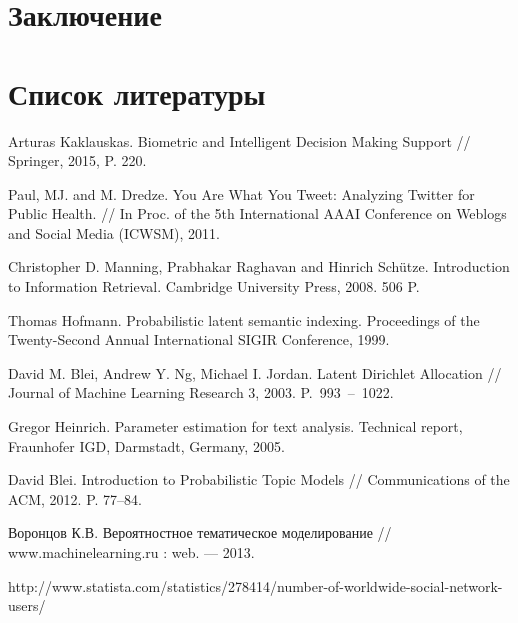 \documentclass[a4paper]{report}
\begin{document}
	
	
	
	\section{Заключение}
	
	
	
	\newpage
	\section{Список литературы}
	
    \begingroup
    \let\clearpage\relax
    \vskip-3cm
	\begin{thebibliography}{9}
	
		Arturas Kaklauskas. Biometric and Intelligent Decision Making Support // Springer, 2015, P. 220.
		
		Paul, MJ. and M. Dredze. You Are What You Tweet: Analyzing Twitter for Public Health. // In Proc. of the 5th International AAAI Conference on Weblogs and Social Media (ICWSM),  2011. 
		
		Christopher D. Manning, Prabhakar Raghavan and Hinrich Schütze. Introduction to Information Retrieval. Cambridge University Press, 2008. 506 P.
		
		Thomas Hofmann. Probabilistic latent semantic indexing. Proceedings of the Twenty-Second Annual International SIGIR Conference, 1999.
		
		David M. Blei, Andrew Y. Ng, Michael I. Jordan. Latent Dirichlet Allocation // Journal of Machine Learning Research 3, 2003. P.~993~--~1022.
		
		Gregor Heinrich. Parameter estimation for text analysis. Technical
report, Fraunhofer IGD, Darmstadt, Germany, 2005.

		David Blei. Introduction to Probabilistic Topic Models // Communications of the ACM, 2012. P. 77–84.

		Воронцов К.В. Вероятностное тематическое моделирование // www.machinelearning.ru : web. — 2013.

		http://www.statista.com/statistics/278414/number-of-worldwide-social-network-users/


\end{thebibliography}
\end{document}
